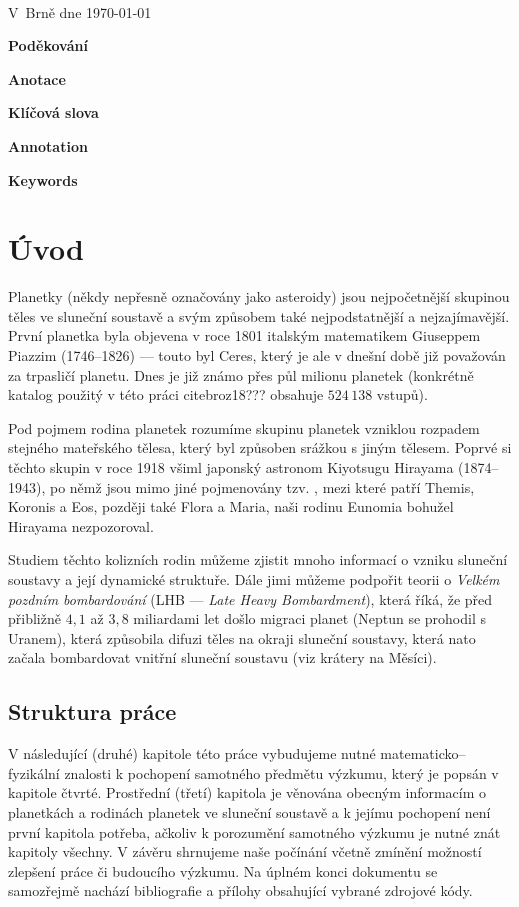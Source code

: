 \documentclass[A4paper, 12pt, oneside]{book}
\begin{document}
\

V~Brně dne \today\ \dotfill \hspace{10mm}

\newpage

{\large \bfseries Poděkování}

\newpage

{\large \bfseries Anotace}

{\large \bfseries Klíčová slova}

{\large \bfseries Annotation}

{\large \bfseries Keywords}

\newpage

\tableofcontents

\newpage %
\pagestyle{headings}
\chapter{Úvod}
Planetky (někdy nepřesně označovány jako asteroidy) jsou nejpočetnější skupinou těles ve sluneční soustavě a svým způsobem také nejpodstatnější a nejzajímavější. První planetka byla objevena v roce 1801 italským matematikem Giuseppem Piazzim (1746--1826) --- touto  byl Ceres, který je ale v dnešní době již považován za trpasličí planetu. Dnes je již známo přes půl milionu planetek (konkrétně katalog použitý v této práci cite{broz18}??? obsahuje $524\,138$ vstupů).

Pod pojmem rodina planetek rozumíme skupinu planetek vzniklou rozpadem stejného mateřského tělesa, který byl způsoben srážkou s jiným tělesem. Poprvé si těchto skupin v roce 1918 všiml japonský astronom Kiyotsugu Hirayama (1874--1943), po němž jsou mimo jiné pojmenovány tzv. , mezi které patří Themis, Koronis a Eos, později také Flora a Maria, naši rodinu Eunomia bohužel Hirayama nezpozoroval. 

Studiem těchto kolizních rodin můžeme zjistit mnoho informací o vzniku sluneční soustavy a její dynamické struktuře. Dále jimi můžeme podpořit teorii o \textit{Velkém pozdním bombardování} (LHB --- \textit{Late Heavy Bombardment}), která říká, že před přibližně $4,1$ až $3,8$ miliardami let došlo migraci planet (Neptun se prohodil s Uranem), která způsobila difuzi těles na okraji sluneční soustavy, která nato začala bombardovat vnitřní sluneční soustavu (viz krátery na Měsíci).

\section{Struktura práce}
V následující (druhé) kapitole této práce vybudujeme nutné matematicko--fyzikální znalosti k pochopení samotného předmětu výzkumu, který je popsán v kapitole čtvrté. Prostřední (třetí) kapitola je věnována obecným informacím o planetkách a rodinách planetek ve sluneční soustavě a k jejímu pochopení není první kapitola potřeba, ačkoliv k porozumění samotného výzkumu je nutné znát kapitoly všechny. V závěru shrnujeme naše počínání včetně zmínění možností zlepšení práce či budoucího výzkumu. Na úplném konci dokumentu se samozřejmě nachází bibliografie a přílohy obsahující vybrané zdrojové kódy.
\end{document}
